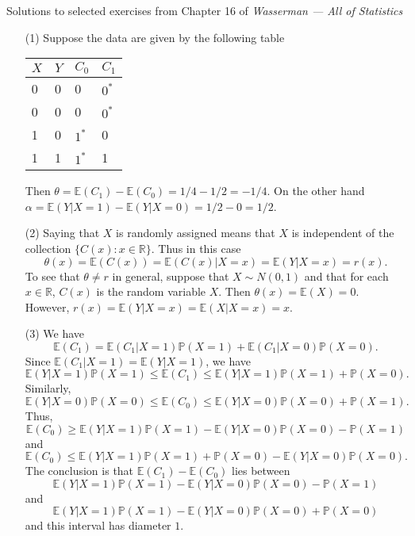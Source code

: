 \documentclass[10pt]{article}
\newcommand{\R}{\mathbb{R}}
\renewcommand{\P}{\mathbb{P}}
\newcommand{\E}{\mathbb{E}}
\begin{document}
\noindent \large{Solutions to selected exercises from Chapter 16 of
\emph{Wasserman --- All of Statistics}}

\begin{enumerate}[(1)]
\item[(1)] Suppose the data are given by the following table

\begin{center}
\begin{tabular}{l l l l}
$X$ & $Y$ & $C_0$ & $C_1$ \\
\hline
\hline
0 & 0 & 0 & $0^*$ \\
0 & 0 & 0 & $0^*$ \\
\hline
1 & 0 & $1^*$ & 0 \\
1 & 1 & $1^*$ & 1 \\
\end{tabular}
\end{center}
Then $\theta = \E(C_1) - \E(C_0)=1/4-1/2=-1/4$. On the other hand
$\alpha = \E(Y|X=1)-\E(Y|X=0)=1/2 - 0 = 1/2$.

\item[(2)] Saying that $X$ is randomly assigned means that $X$ is
independent of the collection $\{C(x):x\in \R\}$. Thus in this case
\[
    \theta(x)=\E(C(x)) = \E(C(x)|X=x)=\E(Y|X=x)=r(x).
\]
To see that $\theta \neq r$ in general, suppose that $X\sim N(0,1)$ and that
for each $x\in \R$, $C(x)$ is the random variable $X$. Then $\theta(x)=\E(X)=0$.
However, $r(x)=\E(Y|X=x)=\E(X|X=x)=x$.

\item[(3)] We have
\[
    \E(C_1)=\E(C_1|X=1)\P(X=1) + \E(C_1|X=0)\P(X=0).
\]
Since $\E(C_1|X=1)=\E(Y|X=1)$, we have
\[
    \E(Y|X=1)\P(X=1) \leq \E(C_1)\leq \E(Y|X=1)\P(X=1) + \P(X=0).
\]
Similarly,
\[
    \E(Y|X=0)\P(X=0) \leq \E(C_0) \leq \E(Y|X=0)\P(X=0)+\P(X=1).
\]
Thus,
\[
    \E(C_0)\geq \E(Y|X=1)\P(X=1) - \E(Y|X=0)\P(X=0) - \P(X=1)
\]
and
\[
    \E(C_0)\leq \E(Y|X=1)\P(X=1) + \P(X=0) - \E(Y|X=0)\P(X=0).
\]
The conclusion is that $\E(C_1)-\E(C_0)$ lies between
\[
    \E(Y|X=1)\P(X=1)-\E(Y|X=0)\P(X=0) - \P(X=1)
\]
and
\[
    \E(Y|X=1)\P(X=1)-\E(Y|X=0)\P(X=0) +\P(X=0)
\]
and this interval has diameter $1$.

\end{enumerate}
\end{document}
